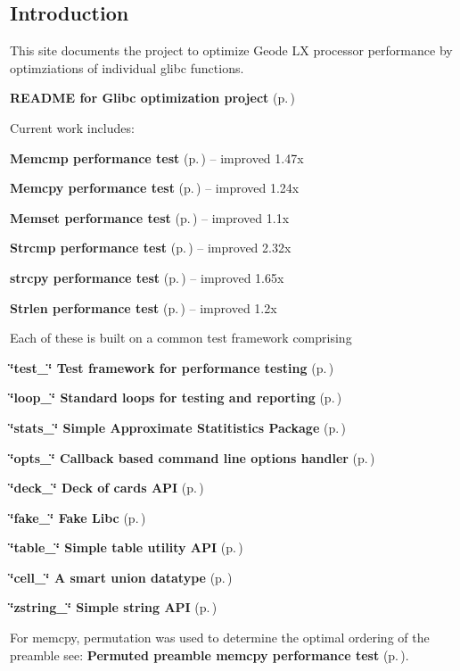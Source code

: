 

\subsection{Introduction}\label{intro}
 This site documents the project to optimize Geode LX processor performance by optimziations of individual glibc functions.

{\bf README for Glibc optimization project} {\rm (p.\,\pageref{group__project__readme})}

Current work includes:\begin{CompactItemize}
\item 
{\bf Memcmp performance test} {\rm (p.\,\pageref{group__memcmp__test})} -- improved 1.47x\item 
{\bf Memcpy performance test} {\rm (p.\,\pageref{group__memcpy__test})} -- improved 1.24x\item 
{\bf Memset performance test} {\rm (p.\,\pageref{group__memset__test})} -- improved 1.1x\item 
{\bf Strcmp performance test} {\rm (p.\,\pageref{group__strcmp__test})} -- improved 2.32x\item 
{\bf strcpy performance test} {\rm (p.\,\pageref{group__strcpy__test})} -- improved 1.65x\item 
{\bf Strlen performance test} {\rm (p.\,\pageref{group__strlen__test})} -- improved 1.2x\end{CompactItemize}
Each of these is built on a common test framework comprising\begin{CompactItemize}
\item 
{\bf \char`\"{}test\_\-\char`\"{} Test framework for performance testing} {\rm (p.\,\pageref{group__test})}\item 
{\bf \char`\"{}loop\_\-\char`\"{} Standard loops for testing and reporting} {\rm (p.\,\pageref{group__loop__test})}\item 
{\bf \char`\"{}stats\_\-\char`\"{} Simple Approximate Statitistics Package} {\rm (p.\,\pageref{group__stats})}\item 
{\bf \char`\"{}opts\_\-\char`\"{} Callback based command line options handler} {\rm (p.\,\pageref{group__opts})}\item 
{\bf \char`\"{}deck\_\-\char`\"{} Deck of cards API} {\rm (p.\,\pageref{group__deck})}\item 
{\bf \char`\"{}fake\_\-\char`\"{} Fake Libc} {\rm (p.\,\pageref{group__fake__lib})}\item 
{\bf \char`\"{}table\_\-\char`\"{} Simple table utility API} {\rm (p.\,\pageref{group__simple__table})}\item 
{\bf \char`\"{}cell\_\-\char`\"{} A smart union datatype} {\rm (p.\,\pageref{group__table__cell})}\item 
{\bf \char`\"{}zstring\_\-\char`\"{} Simple string API} {\rm (p.\,\pageref{group__zstring})}\end{CompactItemize}
For memcpy, permutation was used to determine the optimal ordering of the preamble see: {\bf Permuted preamble memcpy performance test} {\rm (p.\,\pageref{group__permute__memcpy__test})}.

